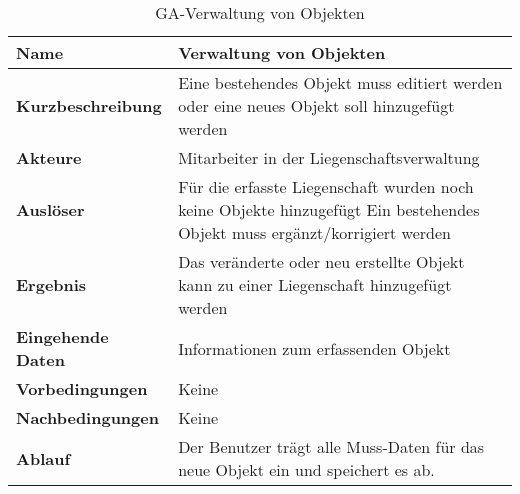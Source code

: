 \begin{table}[H]
  \centering
  \settowidth{}
  \setlength\extrarowheight{2pt}
  \begin{tabulary}{1.0\textwidth}{|a|m{12cm}|}
    \hline
    \textbf{Name}& Verwaltung von Objekten\\
    \hline 
    \textbf{Kurzbeschreibung} & Eine bestehendes Objekt muss editiert werden oder eine neues Objekt soll hinzugefügt werden \\
    \hline
    \textbf{Akteure} & Mitarbeiter in der Liegenschaftsverwaltung\\
    \hline
    \textbf{Auslöser} & Für die erfasste Liegenschaft wurden noch keine Objekte hinzugefügt\newline 
    Ein bestehendes Objekt muss ergänzt/korrigiert werden\\
    \hline
    \textbf{Ergebnis} & Das veränderte oder neu erstellte Objekt kann zu einer Liegenschaft hinzugefügt werden\\
    \hline
    \textbf{Eingehende Daten} & Informationen zum erfassenden Objekt\\
    \hline
    \textbf{Vorbedingungen} & Keine\\
    \hline
    \textbf{Nachbedingungen} & Keine\\
    \hline
    \textbf{Ablauf} & Der Benutzer trägt alle Muss-Daten für das neue Objekt ein und speichert es ab. \\
    \hline
  \end{tabulary}
  \caption{GA-Verwaltung von Objekten}
\end{table}

